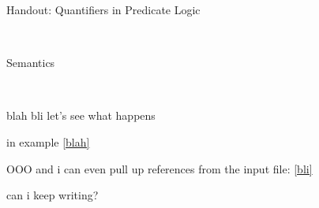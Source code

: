 \documentclass[12pt,letterpaper]{article}
\begin{document}
\begin{center}
\begin{Large}Handout: Quantifiers in Predicate Logic \end{Large}\\
\vspace{.2in}
\begin{large}Semantics\end{large}\\
\vspace{.2in}
\end{center}


blah
bli
let's see what happens

\cite{harley2009}
\cite{fillmore1970}
\cite{harley2014}

%

\begin{exe}
\ex[\label{blah}]{blah}
\end{exe}

in example \ref{blah}

OOO and i can even pull up references from the input file: \ref{bli}

can i keep writing?

\setlength{\bibsep}{0ex}


\end{document}
